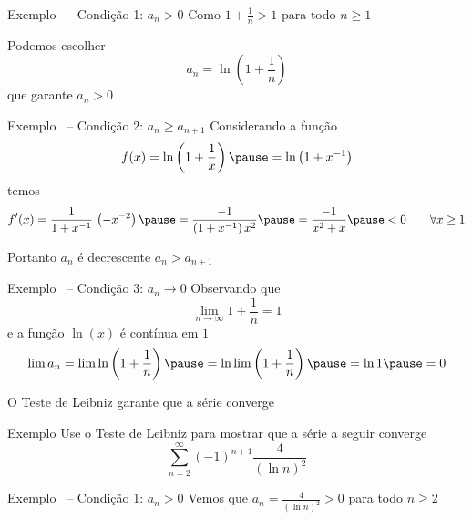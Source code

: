 \documentclass[fleqn,utf8,aspectratio=169,12pt]{beamer}
\begin{document}
\begin{frame}{Exemplo \theexemplo\ -- Condição 1: \(a_n>0\)}
  \pause
  Como
  \(
    1 + \frac{1}{n} > 1
  \)
  para todo $n\geq 1$

  \pause
  \vspace{\baselineskip}
  Podemos escolher
  \[
    a_n = \ln\left(1+\frac{1}{n}\right)
  \]
  que garante $a_n>0$
\end{frame}

\begin{frame}{Exemplo \theexemplo\ -- Condição 2: \(a_n\geq a_{n+1}\)}
  \pause
  Considerando a função
  \[
    f(x)
    = \ln\left(1+\frac{1}{x}\right)
    \pause
    = \ln\left(1+x^{-1}\right)
  \]
  \pause
  temos
  \[
    f'(x)
    = \frac{1}{1+x^{-1}} \, \left(-x^{-2}\right)
    \pause
    = \frac{-1}{\left(1+x^{-1}\right)x^2}
    \pause
    = \frac{-1}{x^2+x}
    \pause
    < 0
    \qquad \forall x\geq 1
  \]

  \pause
  \vspace{0.5\baselineskip}
  Portanto $a_n$ é decrescente \(a_n>a_{n+1}\)
\end{frame}

\begin{frame}{Exemplo \theexemplo\ -- Condição 3: \(a_n\to 0\)}
  \pause
  Observando que
  \[
    \lim_{n\to\infty} 1+\frac{1}{n} = 1
  \]
  \pause
  e a função $\ln(x)$ é contínua em $1$
  \pause
  \[
    \lim a_n
    = \lim \ln \left(1+\frac{1}{n}\right)
    \pause
    = \ln\lim \left(1+\frac{1}{n}\right)
    \pause
    = \ln 1
    \pause
    = 0
  \]

  \pause
  O Teste de Leibniz garante que a série converge
\end{frame}

\addtocounter{exemplo}{1}
\begin{frame}{Exemplo \theexemplo}
  Use o Teste de Leibniz para mostrar que a série a seguir converge
  \[
    \sum_{n=2}^\infty(-1)^{n+1}\frac{4}{(\ln n)^2}
  \]
\end{frame}

\begin{frame}{Exemplo \theexemplo\ -- Condição 1: \(a_n>0\)}
  \pause
  Vemos que
  \(
    a_n = \frac{4}{(\ln n)^2} > 0
  \)
  para todo $n\geq 2$
\end{frame}
\end{document}
